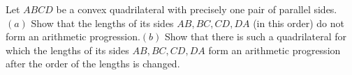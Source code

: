 Let $ABCD$ be a convex quadrilateral with precisely one pair of parallel sides.$(a)$ Show that the lengths of its sides $AB,BC,CD, DA$ (in this order) do not form an arithmetic progression.$(b)$ Show that there is such a quadrilateral for which the lengths of its sides $AB ,BC,CD,DA$ form an arithmetic progression after the order of the lengths is changed.